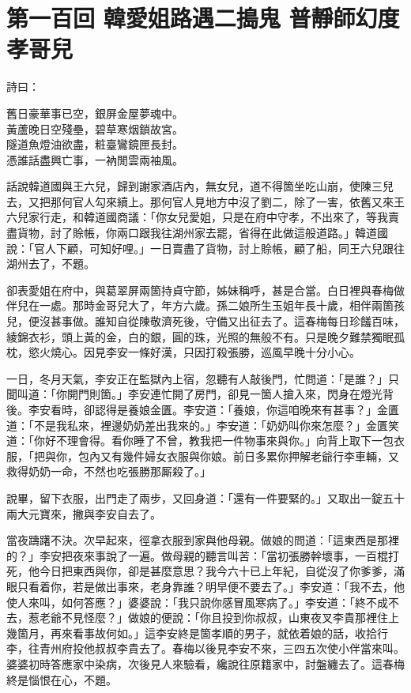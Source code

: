 
\chapter*{第一百回 韓愛姐路遇二搗鬼 普靜師幻度孝哥兒}


詩曰：

\begin{myquote}
舊日豪華事已空，銀屏金屋夢魂中。\\黃蘆晚日空殘壘，碧草寒烟鎖故宮。\\隧道魚燈油欲盡，粧臺鸞鏡匣長封。\\憑誰話盡興亡事，一衲閒雲兩袖風。
\end{myquote}

話說韓道國與王六兒，歸到謝家酒店內，無女兒，道不得箇坐吃山崩，使陳三兒去，又把那何官人勾來續上。那何官人見地方中沒了劉二，除了一害，依舊又來王六兒家行走，和韓道國商議：「你女兒愛姐，只是在府中守孝，不出來了，等我賣盡貨物，討了賒帳，你兩口跟我往湖州家去罷，省得在此做這般道路。」韓道國說：「官人下顧，可知好哩。」{}一日賣盡了貨物，討上賒帳，顧了船，同王六兒跟往湖州去了，不題。

卻表愛姐在府中，與葛翠屏兩箇持貞守節，姊妹稱呼，甚是合當。白日裡與春梅做伴兒在一處。那時金哥兒大了，年方六歲。孫二娘所生玉姐年長十歲，相伴兩箇孩兒，便沒甚事做。誰知自從陳敬濟死後，守備又出征去了。這春梅每日珍饈百味，綾錦衣衫，頭上黃的金，白的銀，圓的珠，光照的無般不有。只是晚夕難禁獨眠孤枕，慾火燒心。{}因見李安一條好漢，只因打殺張勝，巡風早晚十分小心。

一日，冬月天氣，李安正在監獄內上宿，忽聽有人敲後門，忙問道：「是誰？」只聞叫道：「你開門則箇。」李安連忙開了房門，卻見一箇人搶入來，閃身在燈光背後。李安看時，卻認得是養娘金匱。李安道：「養娘，你這咱晚來有甚事？」金匱道：「不是我私來，裡邊奶奶差出我來的。」李安道：「奶奶叫你來怎麼？」金匱笑道：「你好不理會得。看你睡了不曾，教我把一件物事來與你。」向背上取下一包衣服，「把與你，包內又有幾件婦女衣服與你娘。前日多累你押解老爺行李車輛，又救得奶奶一命，不然也吃張勝那厮殺了。」

說畢，留下衣服，出門走了兩步，又回身道：「還有一件要緊的。」又取出一錠五十兩大元寶來，撇與李安自去了。

當夜躊躇不決。次早起來，徑拿衣服到家與他母親。做娘的問道：「這東西是那裡的？」李安把夜來事說了一遍。做母親的聽言叫苦：「當初張勝幹壞事，一百棍打死，他今日把東西與你，卻是甚麼意思？我今六十已上年紀，自從沒了你爹爹，滿眼只看着你，若是做出事來，老身靠誰？明早便不要去了。」{}李安道：「我不去，他使人來叫，如何答應？」婆婆說：「我只說你感冒風寒病了。」李安道：「終不成不去，惹老爺不見怪麼？」做娘的便說：「你且投到你叔叔，山東夜叉李貴那裡住上幾箇月，再來看事故何如。」這李安終是箇孝順的男子，就依着娘的話，收拾行李，往青州府投他叔叔李貴去了。春梅以後見李安不來，三四五次使小伴當來叫。婆婆初時答應家中染病，次後見人來驗看，纔說往原籍家中，討盤纏去了。這春梅終是惱恨在心，不題。

